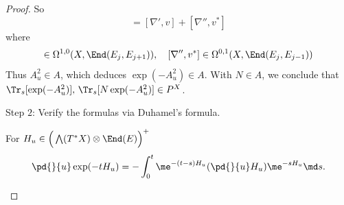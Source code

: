 \begin{proof}
    So 
    \begin{equation*}
        [\nabla^E,V]=[\nabla',v] + [\nabla'',v^*]
    \end{equation*}
    where
    \begin{equation*}
        [\nabla',v]\in \Omega^{1,0}(X,\End(E_j,E_{j+1})),\quad 
        [\nabla'',v^*]\in \Omega^{0,1}(X,\End(E_j,E_{j-1}))
    \end{equation*}
    Thus $A_u^2\in A$, which deduces $\exp(-A_u^2)\in A$. With $N\in A$, 
    we conclude that $\Tr_s[\exp(-A_u^2)],\,\Tr_s[N\exp(-A_u^2)]\in P^X$.

    Step $2$: Verify the formulas via Duhamel's formula.
    \begin{lemma}
        For $H_u\in \Big(\bigwedge(T^*X)\otimes\End(E)\Big)^+$ 
        \begin{equation*}
            \pd{}{u}\exp(-tH_u) = 
            -\int_0^t\me^{-(t-s)H_u}(\pd{}{u}H_u)\me^{-sH_u}\md s.
        \end{equation*}
    \end{lemma}


\end{proof}
